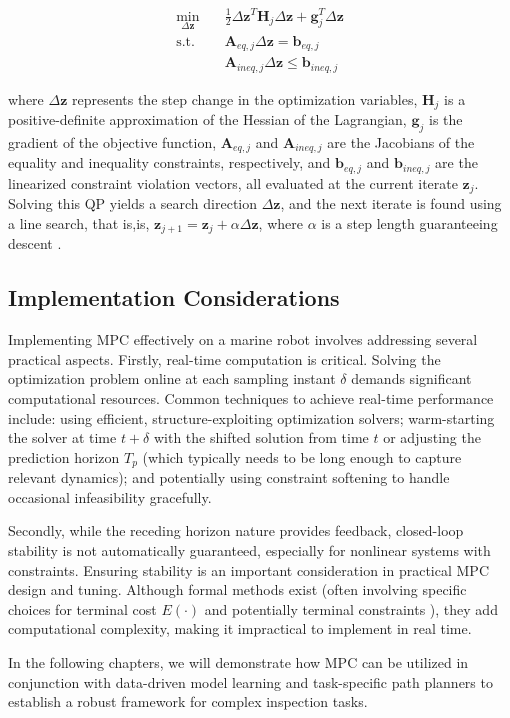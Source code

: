 \begin{equation}
\begin{aligned}
\min_{\Delta\boldsymbol{z}} \quad & \frac{1}{2}\Delta\boldsymbol{z}^T \boldsymbol{H}_j \Delta\boldsymbol{z} + \boldsymbol{g}_j^T \Delta\boldsymbol{z} \\
\text{s.t.} \quad & \boldsymbol{A}_{eq,j} \Delta\boldsymbol{z} = \boldsymbol{b}_{eq,j} \\
& \boldsymbol{A}_{ineq,j} \Delta\boldsymbol{z} \leq \boldsymbol{b}_{ineq,j}
\end{aligned}
\end{equation}

where $\Delta\boldsymbol{z}$ represents the step change in the optimization variables, $\boldsymbol{H}_j$ is a positive-definite approximation of the Hessian of the Lagrangian, $\boldsymbol{g}_j$ is the gradient of the objective function, $\boldsymbol{A}_{eq,j}$ and $\boldsymbol{A}_{ineq,j}$ are the Jacobians of the equality and inequality constraints, respectively, and $\boldsymbol{b}_{eq,j}$ and $\boldsymbol{b}_{ineq,j}$ are the linearized constraint violation vectors, all evaluated at the current iterate $\boldsymbol{z}_j$. Solving this QP yields a search direction $\Delta\boldsymbol{z}$, and the next iterate is found using a line search, that is,is, $\boldsymbol{z}_{j+1} = \boldsymbol{z}_j + \alpha \Delta\boldsymbol{z}$, where $\alpha$ is a step length guaranteeing descent \cite{nocedal1999numerical}.


\subsection{Implementation Considerations}

Implementing MPC effectively on a marine robot involves addressing several practical aspects. Firstly, real-time computation is critical. Solving the optimization problem online at each sampling instant $\delta$ demands significant computational resources. Common techniques to achieve real-time performance include: using efficient, structure-exploiting optimization solvers; warm-starting the solver at time $t+\delta$ with the shifted solution from time $t$ \cite{gros2020linear} or adjusting the prediction horizon $T_p$ (which typically needs to be long enough to capture relevant dynamics); and potentially using constraint softening to handle occasional infeasibility gracefully.

Secondly, while the receding horizon nature provides feedback, closed-loop stability is not automatically guaranteed, especially for nonlinear systems with constraints. Ensuring stability is an important consideration in practical MPC design and tuning. Although formal methods exist (often involving specific choices for terminal cost $E(\cdot)$ and potentially terminal constraints \cite{hao2017nonlinear}), they add computational complexity, making it impractical to implement in real time.

In the following chapters, we will demonstrate how MPC can be utilized in conjunction with data-driven model learning and task-specific path planners to establish a robust framework for complex inspection tasks.